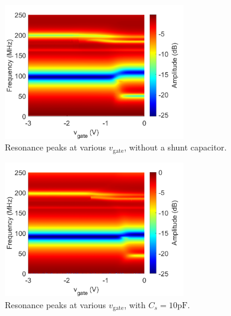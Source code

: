 \documentclass{article}
\begin{document}
\begin{figure}[H]
    \centering
    \includegraphics[width = 0.7\textwidth]{2102xxrf_001_2021.02.02.17.34.26_final_rf-surf.png}
    \caption{Resonance peaks at various $v_\mathrm{gate}$, without a shunt capacitor.}
    \label{fig:extra1}
\end{figure}
\begin{figure}[H]
    \centering
    \includegraphics[width = 0.7\textwidth]{210212rf_003_2021.02.12.12.49.25_final_rf.png}
    \caption{Resonance peaks at various $v_\mathrm{gate}$, with $C_s = 10\si{\pico\farad}$.}
    \label{fig:extra2}
\end{figure}
\end{document}
